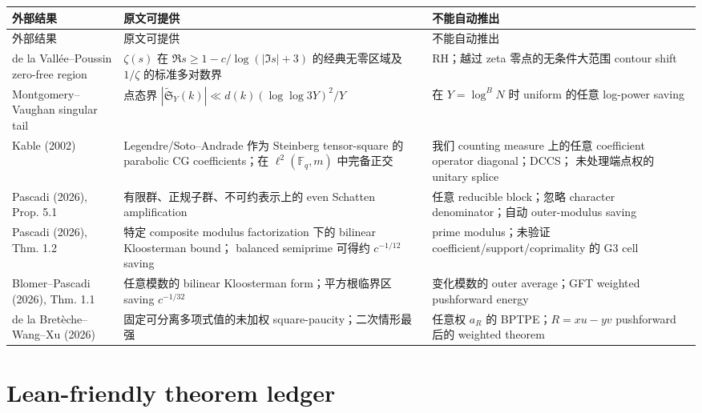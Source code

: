 \documentclass[11pt,a4paper]{ctexart}
\theoremstyle{definition}
\newcommand{\F}{\mathbb F}
\newcommand{\1}{\mathbf 1}
\begin{document}
\begin{center}
\begin{longtable}{p{}p{}p{}}
\toprule
外部结果 & 原文可提供 & 不能自动推出\\
\midrule
\endfirsthead
\toprule
外部结果 & 原文可提供 & 不能自动推出\\
\midrule
\endhead
de la Vall\'ee--Poussin zero-free region
& $\zeta(s)$ 在 $\Re s\ge1-c/\log(|\Im s|+3)$ 的经典无零区域及
$1/\zeta$ 的标准多对数界
& RH；越过 zeta 零点的无条件大范围 contour shift\\
Montgomery--Vaughan singular tail
& 点态界 $|\widetilde{\mathfrak S}_Y(k)|
\ll d(k)(\log\log3Y)^2/Y$
& 在 $Y=\log^B N$ 时 uniform 的任意 log-power saving\\
Kable (2002)
& Legendre/Soto--Andrade 作为 Steinberg tensor-square 的 parabolic CG
coefficients；在 $\ell^2(\F_q,m)$ 中完备正交
& 我们 counting measure 上的任意 coefficient operator diagonal；DCCS；
未处理端点权的 unitary splice\\
Pascadi (2026), Prop. 5.1
& 有限群、正规子群、不可约表示上的 even Schatten amplification
& 任意 reducible block；忽略 character denominator；自动 outer-modulus saving\\
Pascadi (2026), Thm. 1.2
& 特定 composite modulus factorization 下的 bilinear Kloosterman bound；
balanced semiprime 可得约 $c^{-1/12}$ saving
& prime modulus；未验证 coefficient/support/coprimality 的 G3 cell\\
Blomer--Pascadi (2026), Thm. 1.1
& 任意模数的 bilinear Kloosterman form；平方根临界区 saving $c^{-1/32}$
& 变化模数的 outer average；GFT weighted pushforward energy\\
de la Bret\`eche--Wang--Xu (2026)
& 固定可分离多项式值的未加权 square-paucity；二次情形最强
& 任意权 $a_R$ 的 BPTPE；$R=xu-yv$ pushforward 后的 weighted theorem\\
\bottomrule
\end{longtable}
\end{center}

\section{Lean-friendly theorem ledger}
\end{document}
